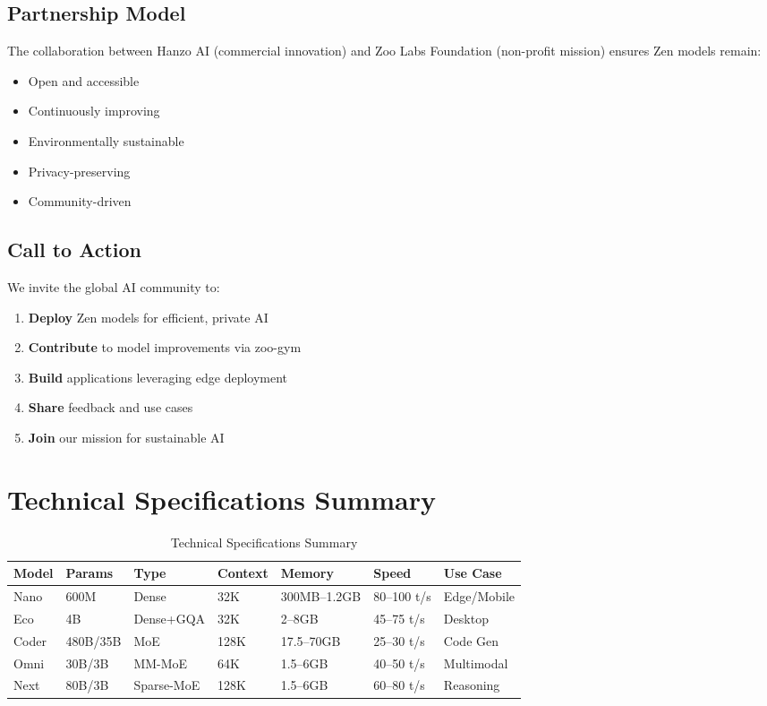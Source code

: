 \documentclass[11pt,a4paper]{article}
\begin{document}
\subsection{Partnership Model}

The collaboration between Hanzo AI (commercial innovation) and Zoo Labs
Foundation (non-profit mission) ensures Zen models remain:
\begin{itemize}
    \item Open and accessible
    \item Continuously improving
    \item Environmentally sustainable
    \item Privacy-preserving
    \item Community-driven
\end{itemize}

\subsection{Call to Action}

We invite the global AI community to:
\begin{enumerate}
    \item \textbf{Deploy} Zen models for efficient, private AI
    \item \textbf{Contribute} to model improvements via zoo-gym
    \item \textbf{Build} applications leveraging edge deployment
    \item \textbf{Share} feedback and use cases
    \item \textbf{Join} our mission for sustainable AI
\end{enumerate}

\appendix

\section{Technical Specifications Summary}

\begin{table}[H]
\centering
\small
\begin{tabular}{lllllll}
\toprule
\textbf{Model} & \textbf{Params} & \textbf{Type} & \textbf{Context} & \textbf{Memory} & \textbf{Speed} & \textbf{Use Case} \\
\midrule
Nano & 600M & Dense & 32K & 300MB--1.2GB & 80--100 t/s & Edge/Mobile \\
Eco & 4B & Dense+GQA & 32K & 2--8GB & 45--75 t/s & Desktop \\
Coder & 480B/35B & MoE & 128K & 17.5--70GB & 25--30 t/s & Code Gen \\
Omni & 30B/3B & MM-MoE & 64K & 1.5--6GB & 40--50 t/s & Multimodal \\
Next & 80B/3B & Sparse-MoE & 128K & 1.5--6GB & 60--80 t/s & Reasoning \\
\bottomrule
\end{tabular}
\caption{Technical Specifications Summary}
\end{table}
\end{document}
